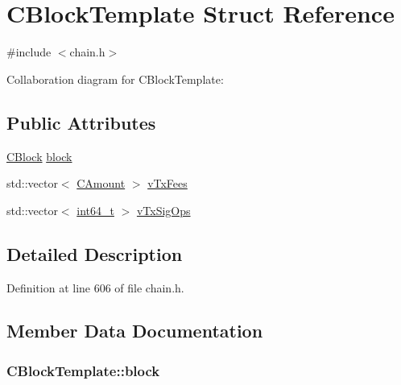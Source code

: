 \hypertarget{struct_c_block_template}{}\section{C\+Block\+Template Struct Reference}
\label{struct_c_block_template}


{\ttfamily \#include $<$chain.\+h$>$}



Collaboration diagram for C\+Block\+Template\+:
\subsection*{Public Attributes}
\begin{DoxyCompactItemize}
\item 
\hyperlink{class_c_block}{C\+Block} \hyperlink{struct_c_block_template_a13261cbac4dc94f996d1b3ff78e41139}{block}
\item 
std\+::vector$<$ \hyperlink{amount_8h_a4eaf3a5239714d8c45b851527f7cb564}{C\+Amount} $>$ \hyperlink{struct_c_block_template_a66287bde795cc8e8c8cb59c4e2302d49}{v\+Tx\+Fees}
\item 
std\+::vector$<$ \hyperlink{stdint_8h_adec1df1b8b51cb32b77e5b86fff46471}{int64\+\_\+t} $>$ \hyperlink{struct_c_block_template_a13326eb92a7d2fc073d9f5660dfcdde5}{v\+Tx\+Sig\+Ops}
\end{DoxyCompactItemize}


\subsection{Detailed Description}


Definition at line 606 of file chain.\+h.



\subsection{Member Data Documentation}
\hypertarget{struct_c_block_template_a13261cbac4dc94f996d1b3ff78e41139}{}
\subsubsection[{block}]{ C\+Block\+Template\+::block}\label{struct_c_block_template_a13261cbac4dc94f996d1b3ff78e41139}



